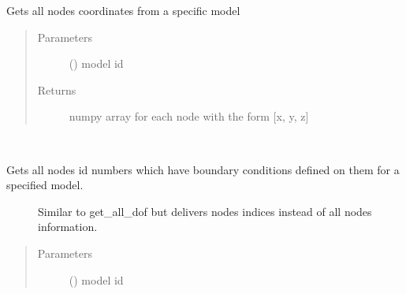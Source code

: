 \documentclass[letterpaper,10pt,english]{sphinxmanual}
\begin{document}
\begin{fulllineitems}
\begin{fulllineitems}
\end{fulllineitems}


\begin{fulllineitems}
\label{\detokenize{api:beamon.database.database.Database.get_nodes}}
Gets all nodes coordinates from a specific model
\begin{quote}\begin{description}
\item[{Parameters}] \leavevmode
{} () \textendash{} model id

\item[{Returns}] \leavevmode
numpy array for each node with the form {[}x, y, z{]}

\end{description}\end{quote}

\end{fulllineitems}


\begin{fulllineitems}
\label{\detokenize{api:beamon.database.database.Database.get_nodes_indexes_with_bc}}~\begin{description}
\item[{Gets all nodes id numbers which have boundary conditions defined on them for a specified model.}] \leavevmode
Similar to get\_all\_dof but delivers nodes indices instead of all nodes information.

\end{description}
\begin{quote}\begin{description}
\item[{Parameters}] \leavevmode
{} () \textendash{} model id


\end{description}
\end{quote}
\end{fulllineitems}
\end{fulllineitems}
\end{document}
